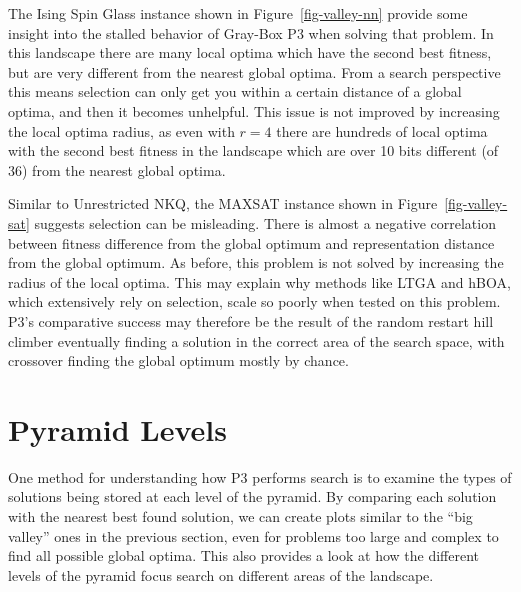The Ising Spin Glass instance shown in Figure~\ref{fig-valley-nn} provide some insight into the stalled behavior of Gray-Box
P3 when solving that problem. In this landscape there are many local optima which have the second best fitness, but are very
different from the nearest global optima. From a search perspective this means selection can only get you within a certain distance
of a global optima, and then it becomes unhelpful. This issue is not improved by increasing the local optima radius, as even with
$r=4$ there are hundreds of local optima with the second best fitness in the landscape which are over 10 bits different (of 36) from
the nearest global optima.

\begin{figure*}
  \centering
  \caption{Location and quality of local optima in comparison to the global optima for a representative MAX-SAT problem
           with $N=36$.}
  \label{fig-valley-sat}
\end{figure*}

Similar to Unrestricted NKQ, the MAXSAT instance shown in Figure~\ref{fig-valley-sat} suggests selection can be misleading.
There is almost a negative correlation between fitness difference from the global optimum and representation distance from the
global optimum. As before, this problem is not solved by increasing the radius of the local optima.
This may explain why methods like LTGA and hBOA, which extensively rely on selection,
scale so poorly when tested on this problem. P3's comparative success may therefore be the result of the random restart hill climber
eventually finding a solution in the correct area of the search space, with crossover finding the global optimum mostly by chance.

\section{Pyramid Levels}
One method for understanding how P3 performs search is to examine the types of solutions being stored at each level
of the pyramid. By comparing each solution with the nearest best found solution, we can create plots similar to the ``big valley''
ones in the previous section, even for problems too large and complex to find all possible global optima. 
This also provides a look at how the different levels of the pyramid focus search on different areas of the landscape.

\begin{figure*}
  \centering
  \caption{Distribution of local optima stored at each level of Gray-Box P3 in relation to the global optimum on
           the Deceptive Step Trap problem $N=6000$ and traps of size 5.}
  \label{fig-level-dst}
\end{figure*}

